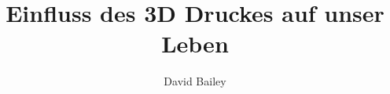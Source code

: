 \documentclass[11pt,a4paper]{article}
\author{David Bailey}
\title{Einfluss des 3D Druckes auf unser Leben}
\begin{document}


\tableofcontents

\cite{BIOMED}

\newpage

\printbibliography
\end{document}
